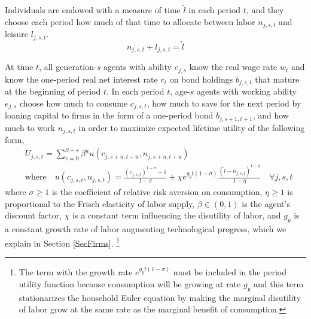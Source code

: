 \documentclass[letterpaper,12pt]{article}
\theoremstyle{definition}
\begin{document}
\begin{spacing}{1.5}
    Individuals are endowed with a measure of time $\tilde{l}$ in each period $t$, and they choose each period how much of that time to allocate between labor $n_{j,s,t}$ and leisure $l_{j,s,t}$.
    \begin{equation}\label{EqLabConstr}
      n_{j,s,t} + l_{j,s,t} = \tilde{l}
    \end{equation}

    \noindent At time $t$, all generation-$s$ agents with ability $e_{j,s}$ know the real wage rate $w_t$ and know the one-period real net interest rate $r_t$ on bond holdings $b_{j,s,t}$ that mature at the beginning of period $t$. In each period $t$, age-$s$ agents with working ability $e_{j,s}$ choose how much to consume $c_{j,s,t}$, how much to save for the next period by loaning capital to firms in the form of a one-period bond $b_{j,s+1,t+1}$, and how much to work $n_{j,s,t}$ in order to maximize expected lifetime utility of the following form,
    \begin{equation}\label{EqUtilMax}
      \begin{split}
        &U_{j,s,t} = \sum_{v=0}^{S-s}\beta^u u\left(c_{j,s+u,t+u},n_{j,s+u,t+u}\right) \\
        &\text{where} \quad u\left(c_{j,s,t},n_{j,s,t}\right) = \frac{\left(c_{j,s,t}\right)^{1-\sigma} - 1}{1-\sigma} + \chi e^{g_y t(1-\sigma)}\frac{(\tilde{l}-n_{j,s,t})^{1-\eta}}{1-\eta} \quad\forall j,s,t
      \end{split}
    \end{equation}
    where $\sigma\geq 1$ is the coefficient of relative risk aversion on consumption, $\eta\geq 1$ is proportional to the Frisch elasticity of labor supply, $\beta\in(0,1)$ is the agent's discount factor, $\chi$ is a constant term influencing the disutility of labor, and $g_y$ is a constant growth rate of labor augmenting technological progress, which we explain in Section \ref{SecFirms}. \footnote{The term with the growth rate $e^{g_y t(1-\sigma)}$ must be included in the period utility function because consumption will be growing at rate $g_y$ and this term stationarizes the household Euler equation by making the marginal disutility of labor grow at the same rate as the marginal benefit of consumption.}


\end{spacing}
\end{document}
